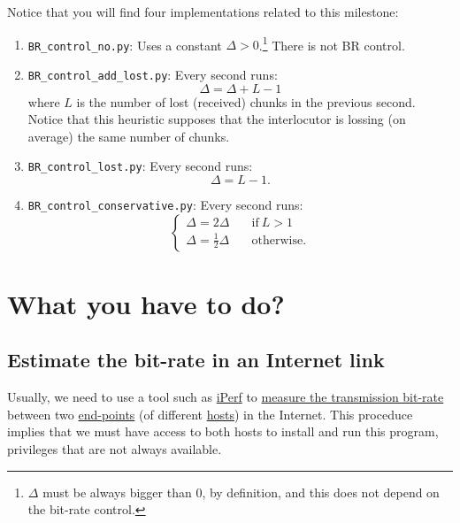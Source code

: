 Notice that you will find four implementations related to this milestone:
\begin{enumerate}
\item \verb|BR_control_no.py|: Uses a constant
  $\Delta>0$.\footnote{$\Delta$ must be always bigger than $0$, by
definition, and this does not depend on the bit-rate control.} There
  is not BR control.
\item \verb|BR_control_add_lost.py|: Every second runs:
  \begin{equation}
    \Delta = \Delta + L - 1
  \end{equation}
  where $L$ is the number of lost (received) chunks in the previous
  second. Notice that this heuristic supposes that the interlocutor is
  lossing (on average) the same number of chunks.
\item \verb|BR_control_lost.py|: Every second runs:
  \begin{equation}
    \Delta = L - 1.
  \end{equation}
\item \verb|BR_control_conservative.py|: Every second runs:
  \begin{equation}
    \left\{
    \begin{array}{ll}
      \Delta = 2\Delta & \quad\text{if}~L>1 \\
      \Delta = \frac{1}{2}\Delta & \quad\text{otherwise}.
    \end{array}
    \right.
  \end{equation}
\end{enumerate}


\section{What you have to do?}
\subsection{Estimate the bit-rate in an Internet link}
Usually, we need to use a tool such as \href{https://iperf.fr/}{iPerf}
to
\href{https://en.wikipedia.org/wiki/Measuring_network_throughput}{measure
  the transmission bit-rate} between
two \href{https://datatracker.ietf.org/doc/html/rfc4113}{end-points}
(of
different \href{https://en.wikipedia.org/wiki/Host_(network)}{hosts})
in the Internet. This proceduce implies that we must have access to
both hosts to install and run this program, privileges that are not
always available.

